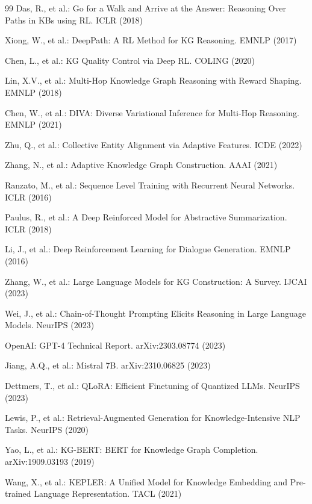 \documentclass[runningheads]{llncs}
\begin{document}
\begin{thebibliography}{99}
Das, R., et al.: Go for a Walk and Arrive at the Answer: Reasoning Over Paths in KBs using RL. ICLR (2018)

Xiong, W., et al.: DeepPath: A RL Method for KG Reasoning. EMNLP (2017)

Chen, L., et al.: KG Quality Control via Deep RL. COLING (2020)

Lin, X.V., et al.: Multi-Hop Knowledge Graph Reasoning with Reward Shaping. EMNLP (2018)

Chen, W., et al.: DIVA: Diverse Variational Inference for Multi-Hop Reasoning. EMNLP (2021)

Zhu, Q., et al.: Collective Entity Alignment via Adaptive Features. ICDE (2022)

Zhang, N., et al.: Adaptive Knowledge Graph Construction. AAAI (2021)

Ranzato, M., et al.: Sequence Level Training with Recurrent Neural Networks. ICLR (2016)

Paulus, R., et al.: A Deep Reinforced Model for Abstractive Summarization. ICLR (2018)

Li, J., et al.: Deep Reinforcement Learning for Dialogue Generation. EMNLP (2016)

Zhang, W., et al.: Large Language Models for KG Construction: A Survey. IJCAI (2023)

Wei, J., et al.: Chain-of-Thought Prompting Elicits Reasoning in Large Language Models. NeurIPS (2023)

OpenAI: GPT-4 Technical Report. arXiv:2303.08774 (2023)

Jiang, A.Q., et al.: Mistral 7B. arXiv:2310.06825 (2023)

Dettmers, T., et al.: QLoRA: Efficient Finetuning of Quantized LLMs. NeurIPS (2023)

Lewis, P., et al.: Retrieval-Augmented Generation for Knowledge-Intensive NLP Tasks. NeurIPS (2020)

Yao, L., et al.: KG-BERT: BERT for Knowledge Graph Completion. arXiv:1909.03193 (2019)

Wang, X., et al.: KEPLER: A Unified Model for Knowledge Embedding and Pre-trained Language Representation. TACL (2021)


\end{thebibliography}
\end{document}

